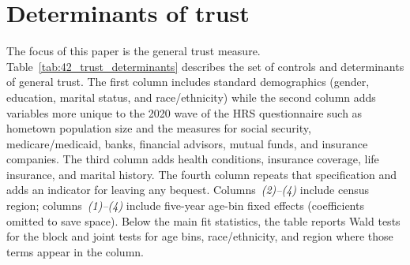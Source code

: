 \providecommand{\ChapterTableNoteText}[1]{\parbox[t]{0.94\textwidth}{#1}}
\providecommand{\InputStataRegTable}[4]{%
\begin{table}[htbp]
\centering
\caption{#1}%
\label{#2}%
\begin{threeparttable}
\small
\resizebox{\textwidth}{!}{%
%
}%
\begin{tablenotes}[flushleft]
\footnotesize
\item \ChapterTableNoteText{#4}%
\end{tablenotes}
\end{threeparttable}
\end{table}%
}
\providecommand{\InputStataRegTableCompact}[4]{%
\begin{table}[htbp]
\centering
\caption{#1}%
\label{#2}%
\begin{threeparttable}
\begingroup
\footnotesize
\setlength{\tabcolsep}{4pt}%
\renewcommand{\arraystretch}{0.94}%
\begin{adjustbox}{max totalsize={\textwidth}{0.65\textheight}}
%
\end{adjustbox}
\endgroup
\begin{tablenotes}[flushleft]
\footnotesize
\item \ChapterTableNoteText{#4}%
\end{tablenotes}
\end{threeparttable}
\end{table}%
}

\section{Determinants of trust}
\label{sec:appendix}

\par The focus of this paper is the general trust measure. Table~\ref{tab:42_trust_determinants} describes the set of controls and determinants of general trust. The first column includes standard demographics (gender, education, marital status, and race/ethnicity) while the second column adds variables more unique to the 2020 wave of the HRS questionnaire such as hometown population size and the  measures for social security, medicare/medicaid, banks, financial advisors, mutual funds, and insurance companies. The third column adds health conditions, insurance coverage, life insurance, and marital history. The fourth column repeats that specification and adds an indicator for leaving any bequest. Columns~\textit{(2)--(4)} include census region; columns~\textit{(1)--(4)} include five-year age-bin fixed effects (coefficients omitted to save space). Below the main fit statistics, the table reports Wald tests for the  block and joint tests for age bins, race/ethnicity, and region where those terms appear in the column.

